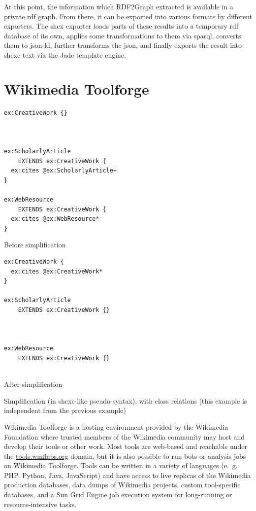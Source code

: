 At this point, the information which \gls{RDF2Graph} extracted is available in a private \gls{rdf} graph.
From there, it can be exported into various formats by different exporters.
The \gls{shex} exporter loads parts of these results into a temporary \gls{rdf} database of its own,
applies some transformations to them via \gls{sparql},
converts them to \gls{json-ld},
further transforms the \gls{json},
and finally exports the result into \gls{shexc} text via the Jade template engine.

\section{Wikimedia Toolforge}
\label{sec:Background:Toolforge}

\begin{listing}[t]
\begin{sublisting}[t]{0.45\textwidth}
\begin{lstlisting}
ex:CreativeWork {}



ex:ScholarlyArticle
    EXTENDS ex:CreativeWork {
  ex:cites @ex:ScholarlyArticle+
}

ex:WebResource
    EXTENDS ex:CreativeWork {
  ex:cites @ex:WebResource*
}
\end{lstlisting}
\caption{Before simplification}
\label{fig:simplify-classes-before}
\end{sublisting}
\begin{sublisting}[t]{0.45\textwidth}
\begin{lstlisting}[showlines=true]
ex:CreativeWork {
  ex:cites @ex:CreativeWork*
}

ex:ScholarlyArticle
    EXTENDS ex:CreativeWork {}



ex:WebResource
    EXTENDS ex:CreativeWork {}


\end{lstlisting}
\caption{After simplification}
\label{fig:simplify-classes-after}
\end{sublisting}
\caption[Simplification, with class relations]{
  Simplification (in \acrshort{shexc}-like pseudo-syntax), with class relations
  (this example is independent from the previous example)
}
\label{fig:simplify-classes}
\end{listing}

\gls{Wikimedia Toolforge} is a hosting environment provided by the \gls{Wikimedia Foundation}
where trusted members of the \gls{Wikimedia} community may host and develop their tools or other work.
Most tools are web-based and reachable under the \href{https://tools.wmflabs.org/}{tools.wmflabs.org} domain,
but it is also possible to run bots or analysis jobs on \gls{Wikimedia Toolforge}.
Tools can be written in a variety of languages
(e.~g. PHP, Python, Java, \gls{JavaScript})
and have access to live replicas of the \gls{Wikimedia} production databases,
data dumps of \gls{Wikimedia} projects,
custom tool-specific databases,
and a Sun Grid Engine job execution system for long-running or resource-intensive tasks.
